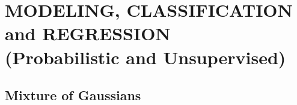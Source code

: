 \documentclass{book}
\begin{document}
\part{MODELING, CLASSIFICATION and REGRESSION\\(Probabilistic and Unsupervised)}
\chapter{Mixture of Gaussians}


\cite{GaussProc_SimpleIntro}
\cite{BOOK_GMPL}

\printbibliography
\end{document}

